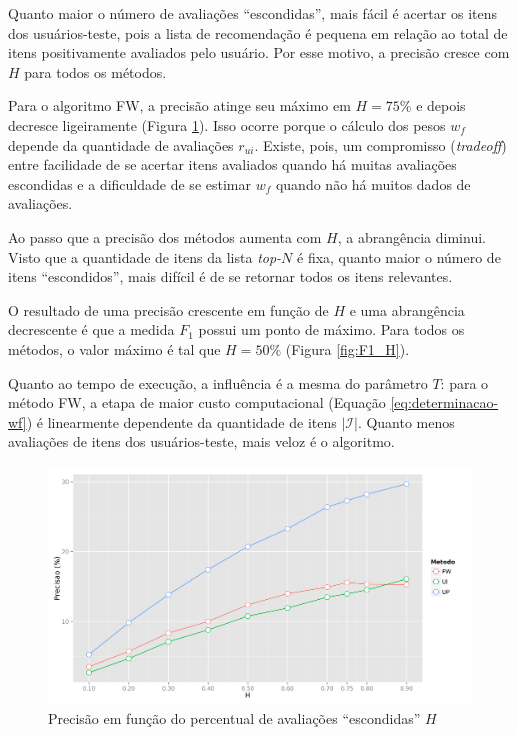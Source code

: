 Quanto maior o número de avaliações ``escondidas'', mais fácil é acertar os itens dos usuários-teste, pois a lista de recomendação é pequena em relação ao total de itens positivamente avaliados pelo usuário. Por esse motivo, a precisão cresce com $H$ para todos os métodos. 

Para o algoritmo FW, a precisão atinge seu máximo em $H=75\%$ e depois decresce ligeiramente (Figura \ref{fig:precision_H}). Isso ocorre porque o cálculo dos pesos $w_f$ depende da quantidade de avaliações $r_{ui}$. Existe, pois, um compromisso (\textit{tradeoff}) entre facilidade de se acertar itens avaliados quando há muitas avaliações escondidas e a dificuldade de se estimar $w_f$ quando não há muitos dados de avaliações.  

Ao passo que a precisão dos métodos aumenta com $H$, a abrangência diminui. Visto que a quantidade de itens da lista \textit{top-}$N$ é fixa, quanto maior o número de itens ``escondidos'', mais difícil é de se retornar todos os itens relevantes.

O resultado de uma precisão crescente em função de $H$ e uma abrangência decrescente é que a medida $F_1$ possui um ponto de máximo. Para todos os métodos, o valor máximo é tal que $H=50\%$ (Figura \ref{fig:F1_H}).

Quanto ao tempo de execução, a influência é a mesma do parâmetro $T$: 
para o método FW, a etapa de maior custo computacional (Equação \ref{eq:determinacao-wf}) é linearmente dependente da quantidade de itens $\left|\mathcal{I}\right|$. Quanto menos avaliações de itens dos usuários-teste, mais veloz é o algoritmo.


\begin{figure}[htp]
    \begin{center}
    \includegraphics[width=1\textwidth]{img/precision_H}
    \end{center}
    \caption{Precisão em função do percentual de avaliações ``escondidas'' $H$}
    \label{fig:precision_H}
\end{figure}


